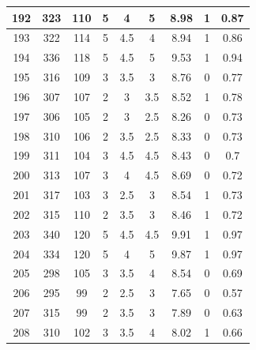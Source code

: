 \documentclass[11pt]{article}
\begin{document}
\begin{appendix}
\begin{longtable}[H]{|c|c|c|c|c|c|c|c|c|}
	192        & 323       & 110         & 5                 & 4   & 5   & 8.98 & 1        & 0.87            \\ \hline
	193        & 322       & 114         & 5                 & 4.5 & 4   & 8.94 & 1        & 0.86            \\ \hline
	194        & 336       & 118         & 5                 & 4.5 & 5   & 9.53 & 1        & 0.94            \\ \hline
	195        & 316       & 109         & 3                 & 3.5 & 3   & 8.76 & 0        & 0.77            \\ \hline
	196        & 307       & 107         & 2                 & 3   & 3.5 & 8.52 & 1        & 0.78            \\ \hline
	197        & 306       & 105         & 2                 & 3   & 2.5 & 8.26 & 0        & 0.73            \\ \hline
	198        & 310       & 106         & 2                 & 3.5 & 2.5 & 8.33 & 0        & 0.73            \\ \hline
	199        & 311       & 104         & 3                 & 4.5 & 4.5 & 8.43 & 0        & 0.7             \\ \hline
	200        & 313       & 107         & 3                 & 4   & 4.5 & 8.69 & 0        & 0.72            \\ \hline
	201        & 317       & 103         & 3                 & 2.5 & 3   & 8.54 & 1        & 0.73            \\ \hline
	202        & 315       & 110         & 2                 & 3.5 & 3   & 8.46 & 1        & 0.72            \\ \hline
	203        & 340       & 120         & 5                 & 4.5 & 4.5 & 9.91 & 1        & 0.97            \\ \hline
	204        & 334       & 120         & 5                 & 4   & 5   & 9.87 & 1        & 0.97            \\ \hline
	205        & 298       & 105         & 3                 & 3.5 & 4   & 8.54 & 0        & 0.69            \\ \hline
	206        & 295       & 99          & 2                 & 2.5 & 3   & 7.65 & 0        & 0.57            \\ \hline
	207        & 315       & 99          & 2                 & 3.5 & 3   & 7.89 & 0        & 0.63            \\ \hline
	208        & 310       & 102         & 3                 & 3.5 & 4   & 8.02 & 1        & 0.66            \\ \hline

\end{longtable}
\end{appendix}
\end{document}
